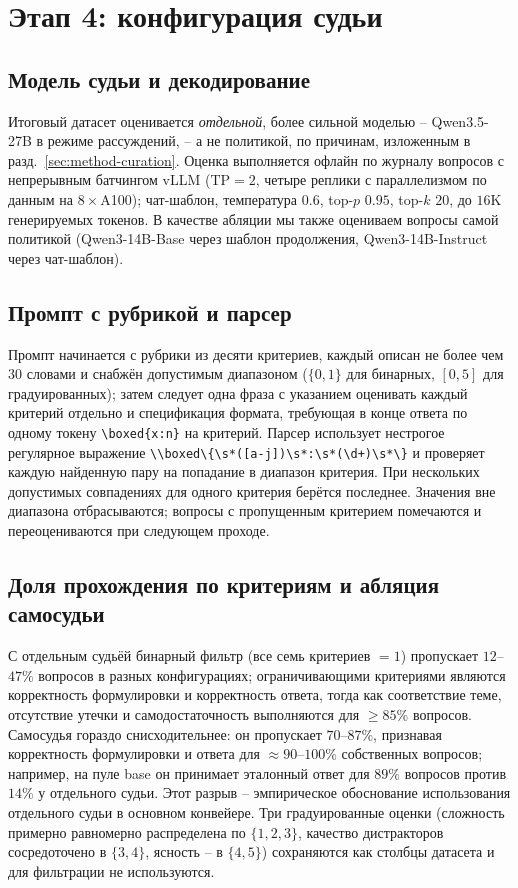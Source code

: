 \documentclass{article}
\begin{document}
\section{Этап 4: конфигурация судьи}\label{app:judge}

\subsection{Модель судьи и декодирование}
Итоговый датасет оценивается \emph{отдельной}, более сильной моделью -- Qwen3.5-27B в режиме рассуждений, -- а не политикой, по причинам, изложенным в разд.~\ref{sec:method-curation}. Оценка выполняется офлайн по журналу вопросов с непрерывным батчингом vLLM ($\mathrm{TP}=2$, четыре реплики с параллелизмом по данным на $8\times$A100); чат-шаблон, температура $0.6$, top-$p$ $0.95$, top-$k$ $20$, до $16$K генерируемых токенов. В качестве абляции мы также оцениваем вопросы самой политикой (Qwen3-14B-Base через шаблон продолжения, Qwen3-14B-Instruct через чат-шаблон).

\subsection{Промпт с рубрикой и парсер}
Промпт начинается с рубрики из десяти критериев, каждый описан не более чем $30$ словами и снабжён допустимым диапазоном ($\{0, 1\}$ для бинарных, $[0, 5]$ для градуированных); затем следует одна фраза с указанием оценивать каждый критерий отдельно и спецификация формата, требующая в конце ответа по одному токену \verb|\boxed{x:n}| на критерий. Парсер использует нестрогое регулярное выражение \verb|\\boxed\{\s*([a-j])\s*:\s*(\d+)\s*\}| и проверяет каждую найденную пару на попадание в диапазон критерия. При нескольких допустимых совпадениях для одного критерия берётся последнее. Значения вне диапазона отбрасываются; вопросы с пропущенным критерием помечаются и переоцениваются при следующем проходе.

\subsection{Доля прохождения по критериям и абляция самосудьи}
С отдельным судьёй бинарный фильтр (все семь критериев $=1$) пропускает $12$--$47\%$ вопросов в разных конфигурациях; ограничивающими критериями являются корректность формулировки и корректность ответа, тогда как соответствие теме, отсутствие утечки и самодостаточность выполняются для $\ge 85\%$ вопросов. Самосудья гораздо снисходительнее: он пропускает $70$--$87\%$, признавая корректность формулировки и ответа для $\approx 90$--$100\%$ собственных вопросов; например, на пуле base он принимает эталонный ответ для $89\%$ вопросов против $14\%$ у отдельного судьи. Этот разрыв -- эмпирическое обоснование использования отдельного судьи в основном конвейере. Три градуированные оценки (сложность примерно равномерно распределена по $\{1,2,3\}$, качество дистракторов сосредоточено в $\{3,4\}$, ясность -- в $\{4,5\}$) сохраняются как столбцы датасета и для фильтрации не используются.
\end{document}
